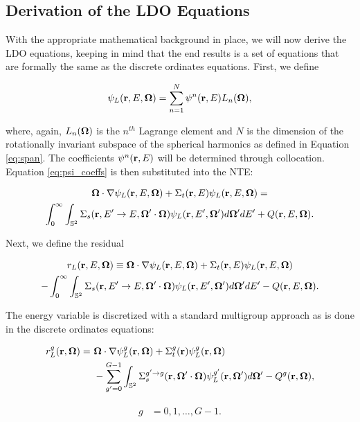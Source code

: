 \subsection{Derivation of the LDO Equations}
\label{sec:ldo-deriv}

With the appropriate mathematical background in place, we will now derive the LDO 
equations, keeping in mind that the end results is a set of equations that are 
formally the same as the discrete ordinates equations. First, we define 

\begin{equation}
\psi_L(\textbf{r},E,\mathbf\Omega) = \sum_{n=1}^{N}\psi^n(\textbf{r},E)L_n(\mathbf\Omega),
\label{eq:psi_coeffs}
\end{equation}

\noindent where, again, $L_n(\mathbf\Omega)$ is the $n^{th}$ Lagrange element and $N$ 
is the dimension of the rotationally invariant subspace of the spherical harmonics as
defined in Equation \ref{eq:span}. The coefficients $\psi^n(\textbf{r},E)$ will be 
determined through collocation. Equation \ref{eq:psi_coeffs} is then substituted into
the NTE:

\begin{multline}
\mathbf\Omega\cdot\nabla\psi_L(\textbf{r},E,\mathbf\Omega) + \Sigma_t(\textbf{r},E)\psi_L(\textbf{r},E,\mathbf\Omega) = \\
\int_{0}^{\infty}\int_{\mathbb{S}^2}\Sigma_s(\textbf{r},E'\rightarrow E, \mathbf\Omega'\cdot\mathbf\Omega)
\psi_L(\textbf{r},E',\mathbf\Omega')d\mathbf\Omega'dE' + Q(\textbf{r},E,\mathbf\Omega).
\end{multline}

\noindent Next, we define the residual

\begin{multline}
r_L(\textbf{r},E,\mathbf\Omega) \equiv \mathbf\Omega\cdot\nabla\psi_L(\textbf{r},E,\mathbf\Omega) + 
\Sigma_t(\textbf{r},E)\psi_L(\textbf{r},E,\mathbf\Omega) \\
- \int_{0}^{\infty}\int_{\mathbb{S}^2}\Sigma_s(\textbf{r},E'\rightarrow E, \mathbf\Omega'\cdot\mathbf\Omega)
\psi_L(\textbf{r},E',\mathbf\Omega')d\mathbf\Omega'dE' - Q(\textbf{r},E,\mathbf\Omega).
\end{multline}

\noindent The energy variable is discretized with a standard multigroup approach as is
done in the discrete ordinates equations:

\noindent\begin{minipage}{0.7\textwidth}
\begin{align*}
r_L^g(\textbf{r},\mathbf\Omega) =\ &\mathbf\Omega\cdot\nabla\psi^{g}_L(\textbf{r},\mathbf\Omega)
+ \Sigma_t^g(\textbf{r})\psi^{g}_L(\textbf{r},\mathbf\Omega) \\
&- \sum_{g'=0}^{G-1}
\int_{\mathbb{S}^2}\Sigma_{s}^{g'\rightarrow g}(\textbf{r},\mathbf\Omega'\cdot\mathbf\Omega)
\psi^{g'}_L(\textbf{r},\mathbf\Omega')d\mathbf\Omega' - Q^g(\textbf{r},\mathbf\Omega),
\end{align*}
\end{minipage}
\hspace{-0.5cm}
\begin{minipage}{0.3\textwidth}
\begin{align}
\begin{split}
g &= 0,1,\ldots,G-1.
\end{split}
\end{align}
\end{minipage}
\vspace{0.1cm}

